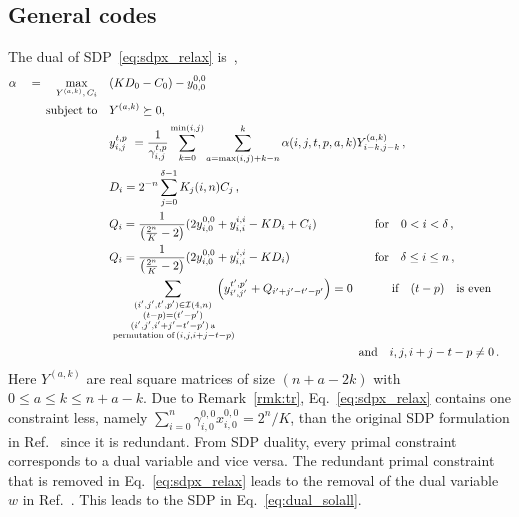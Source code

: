 \documentclass[12pt,a4paper]{amsart}
\newcommand{\II}{\mathcal{I}}
\newcommand{\nn}{\nonumber}
\begin{document}
\subsection{General codes}
% 
The dual of SDP~\eqref{eq:sdpx_relax} is~\cite{munne2025sdpboundsquantumcodes},
% 
\begin{align}\label{eq:dual_solall}
	\alpha \quad = \quad \max_{Y^{(a,k)},\, C_i} \quad &   (KD_0-C_0)  - {y^{0,0}_{0,0}} \quad &  \nn \\
	\text{subject to}  \quad & Y^{(a,k)} \succeq0,\nn \\
	& y^{t,p}_{i,j}\ = \frac{1}{\gamma^{t,p}_{i,j}} \sum^{\min(i,j)}_{k=0} \sum^k_{a=\max(i,j)+k-n} \alpha(i,j,t,p,a,k) Y^{(a,k)}_{i-k,j-k}\,, \nn \\
	&D_i = 2^{-n} \sum^{\delta-1}_{j=0} K_j(i,n)  C_{j} \,, \nn \\
	&Q_i=\frac{1}{\left(\frac{2^n}{K}-2\right)}   (2y^{0,0}_{i,0} + y^{i,i}_{i,i} -KD_i + C_i)
	\quad\quad\quad\quad\quad\hspace{-0.03cm} \text{for} \quad 0 <i <\delta \,,\nn \\
	& Q_i=\frac{1}{\left(\frac{2^n}{K}-2\right)}   (2y^{0,0}_{i,0} + y^{i,i}_{i,i} -KD_i)
	\quad\quad\quad\quad\quad\quad\quad\, \text{for} \quad \delta \leq i \leq n \,, \nn \\
	& \sum_{\substack{ (i',j',t',p')\in \II(4,n) \\ (t-p)=(t'-p') \\ (i',j',i'+j'-t'-p') \, \text{a} \\
			\, \text{permutation of} \,  (i,j,i+j-t-p) \\ }} \!\!\!\!\!\!\!\!\!\!  
	\left(y^{t',p'}_{i',j'}+ Q_{i'+j'-t'-p'}\right) = 0 \quad  \hspace{2.3em} \text{if} \quad (t-p) \quad \text{is even}  \nn \\ &  \vspace{-10cm}\hspace{6cm}
    \quad\quad\quad\quad \text{and} \quad i,j,i+j-t-p \neq 0 \,.
\end{align}
% 
Here $Y^{(a,k)}$ are real square matrices of size $(n+a-2k)$ with $0\leq a\leq k\leq n+a-k$.
% 
Due to Remark~\ref{rmk:tr}, Eq.~\eqref{eq:sdpx_relax} contains one constraint less,
namely $\sum^{n}_{i=0}\gamma^{0,0}_{i,0} x^{0,0}_{i,0}=2^n/K$,
than 
the original SDP formulation in Ref.~\cite{munne2025sdpboundsquantumcodes}
since it is redundant. 
From SDP duality, every primal constraint corresponds to a dual variable and vice versa.
% 
The redundant primal constraint that is removed in Eq.~\eqref{eq:sdpx_relax} leads to the removal of the dual variable $w$ in Ref.~\cite[Proposition 26]{munne2025sdpboundsquantumcodes}.
% 
This leads to the SDP in Eq.~\eqref{eq:dual_solall}.
\end{document}
